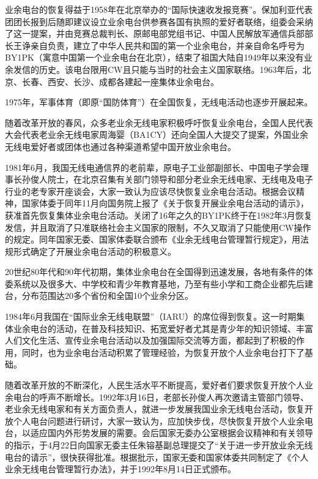 \documentclass[12pt,UTF8]{ctexbook}
\begin{document}
业余电台的恢复得益于1958年在北京举办的“国际快速收发报竞赛”。保加利亚代表团团长报到后随即建议设立业余电台供参赛各国有执照的爱好者联络，组委会采纳了这一提案，并由竞赛总裁判长、原邮电部党组书记、中国人民解放军通信兵部部长王诤亲自负责，建立了中华人民共和国的第一个业余电台，并亲自命名呼号为BY1PK（寓意中国第一个业余电台在北京），结束了祖国大陆自1949年以来没有业余发信的历史。该电台限用CW且只能与当时的社会主义国家联络。1963年后，北京、长春、西安、长沙、成都各建起一座集体业余电台。

1975年，军事体育（即原“国防体育”）在全国恢复，无线电活动也逐步开展起来。

随着改革开放的春风，众多老业余无线电家积极呼吁恢复业余电台，全国人民代表大会代表老业余无线电家周海婴（BA1CY）还向全国人大提交了提案，外国业余无线电爱好者或团体也通过各种渠道希望中国开放业余电台。

1981年6月，我国无线电通信界的老前辈，原电子工业部副部长、中国电子学会理事长孙俊人院士，在北京召集有关部门领导和部分老业余无线电家、无线电及电子行业的老专家开座谈会，大家一致认为应该尽快恢复业余电台活动。根据会议精神，国家体委于同年11月向国务院上报了《关于恢复开展业余电台活动的请示》，获准首先恢复集体业余电台活动。关闭了16年之久的BY1PK终于在1982年3月恢复发信，并且取消了只准联络社会主义国家的限制，不久又取消了只能使用CW操作的规定。同年国家无委、国家体委联合颁布《业余无线电台管理暂行规定》，用法规形式确定了开展业余电台活动的积极意义。

20世纪80年代和90年代初期，集体业余电台在全国得到迅速发展，各地有条件的体委系统以及很多大、中学校和青少年教育基地，乃至有些小学和工商企业都先后建台，分布范围达20多个省份和全国10个业余分区。

1984年6月我国在“国际业余无线电联盟”（IARU）的席位得到恢复。这一时期集体业余电台的活动，在普及科技知识、拓宽爱好者尤其是青少年的知识领域、丰富人们文化生活、宣传业余电台活动以及加强国际交流等方面，都起到了积极的作用，同时，也为业余电台活动积累了管理经验，为恢复开放个人业余电台打下了基础。

随着改革开放的不断深化，人民生活水平不断提高，爱好者们要求恢复开放个人业余电台的呼声不断增长。1992年3月16日，老部长孙俊人再次邀请主管部门领导、老业余无线电家和有关方面负责人，就进一步发展我国业余无线电台活动，恢复开放个人电台问题进行研讨，大家一致认为，应加快步伐，尽快恢复开放个人业余电台，以适应国内外形势发展的需要。会后国家无委办公室根据会议精神和有关领导的指示，于4月22日向国家无委主任朱镕基副总理提交了“关于进一步开放业余无线电台的请示”，很快获得批准。根据批示，国家无委和国家体委共同制定了《个人业余无线电台管理暂行办法》，并于1992年8月14日正式颁布。
\end{document}
